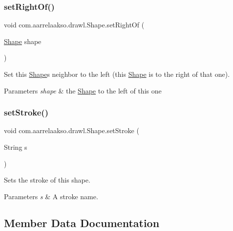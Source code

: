 \subsubsection{\texorpdfstring{set\+Right\+Of()}{setRightOf()}}
{\footnotesize\ttfamily void com.\+aarrelaakso.\+drawl.\+Shape.\+set\+Right\+Of (\begin{DoxyParamCaption}\item[{\hyperlink{classcom_1_1aarrelaakso_1_1drawl_1_1_shape}{Shape}}]{shape }\end{DoxyParamCaption})\hspace{0.3cm}{\ttfamily [inherited]}}

Set this \hyperlink{classcom_1_1aarrelaakso_1_1drawl_1_1_shape}{Shape}\textquotesingle{}s neighbor to the left (this \hyperlink{classcom_1_1aarrelaakso_1_1drawl_1_1_shape}{Shape} is to the right of that one).


\begin{DoxyParams}{Parameters}
{\em shape} & the \hyperlink{classcom_1_1aarrelaakso_1_1drawl_1_1_shape}{Shape} to the left of this one \\
\hline
\end{DoxyParams}
\mbox{\label{classcom_1_1aarrelaakso_1_1drawl_1_1_shape_a3930f6fe72f6c5e0c0aa4c25ffbf18ff}} 
\subsubsection{\texorpdfstring{set\+Stroke()}{setStroke()}}
{\footnotesize\ttfamily void com.\+aarrelaakso.\+drawl.\+Shape.\+set\+Stroke (\begin{DoxyParamCaption}\item[{String}]{s }\end{DoxyParamCaption})\hspace{0.3cm}{\ttfamily [inherited]}}

Sets the stroke of this shape.


\begin{DoxyParams}{Parameters}
{\em s} & A stroke name. \\
\hline
\end{DoxyParams}


\subsection{Member Data Documentation}
\mbox{\label{classcom_1_1aarrelaakso_1_1drawl_1_1_text_a8889cc854715e5a1b9195ca490c03865}} 
